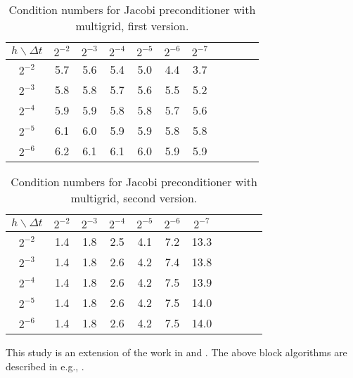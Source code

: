 \documentclass{report}
\begin{document}
\begin{table}[h]
\begin{center}
\begin{tabular}{|c||c|c|c|c|c|c|c|c|c|c|} \hline
$h\backslash \Delta t $ & $2^{-2}$ & $2^{-3}$ & $2^{-4}$ & $2^{-5}$ &
$2^{-6}$ & $2^{-7}$ \\ \hline
$2^{-2}$ & 5.7 & 5.6 & 5.4 & 5.0 & 4.4 & 3.7 \\
$2^{-3}$ & 5.8 & 5.8 & 5.7 & 5.6 & 5.5 & 5.2 \\
$2^{-4}$ & 5.9 & 5.9 & 5.8 & 5.8 & 5.7 & 5.6 \\
$2^{-5}$ & 6.1 & 6.0 & 5.9 & 5.9 & 5.8 & 5.8 \\
$2^{-6}$ & 6.2 & 6.1 & 6.1 & 6.0 & 5.9 & 5.9 \\
\hline
\end{tabular}
\end{center}
\caption{Condition numbers for Jacobi preconditioner with
multigrid, first version. }
\label{first:mg}
\end{table}




\begin{table}[h]
\begin{center}
\begin{tabular}{|c||c|c|c|c|c|c|c|c|c|c|} \hline
$h\backslash \Delta t $ & $2^{-2}$ & $2^{-3}$ & $2^{-4}$ & $2^{-5}$ &
$2^{-6}$ & $2^{-7}$ \\ \hline
$2^{-2}$ & 1.4 & 1.8 & 2.5 & 4.1 & 7.2 & 13.3 \\
$2^{-3}$ & 1.4 & 1.8 & 2.6 & 4.2 & 7.4 & 13.8 \\
$2^{-4}$ & 1.4 & 1.8 & 2.6 & 4.2 & 7.5 & 13.9 \\
$2^{-5}$ & 1.4 & 1.8 & 2.6 & 4.2 & 7.5 & 14.0 \\
$2^{-6}$ & 1.4 & 1.8 & 2.6 & 4.2 & 7.5 & 14.0 \\
\hline
\end{tabular}
\end{center}
\caption{Condition numbers for Jacobi preconditioner with
multigrid, second version. }
\label{second:mg}
\end{table}


This study is an extension of the work in \cite{Pennacchio} and \cite{block-mg}.
The above block algorithms are described in e.g., \cite{Hackbusch}.
\end{document}
